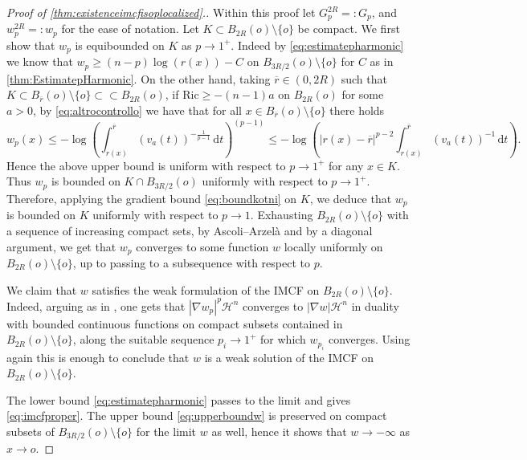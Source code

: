 \documentclass[a4paper,12pt,reqno]{amsart}
\numberwithin{equation}{section}
\theoremstyle{plain}
\theoremstyle{definition}
\theoremstyle{remark}
\newcommand{\abs}[1]{\left\lvert#1\right\rvert}
\newcommand{\vol}{\mathcal{H}^n}
\newcommand{\de}{\ensuremath{\,\mathrm d}} %
\begin{document}
{\begin{proof}[Proof of \cref{thm:existenceimcfisoplocalized}.]
Within this proof let $G_p^{2R} =: G_p$, and $w_p^{2R} =: w_p$ for the ease of notation. Let $K \subset B_{2R}(o) \setminus \{o\}$ be compact. We first show that $w_p$ is equibounded on $K$ as $p \to 1^+$. Indeed by \eqref{eq:estimatepharmonic} we know that $w_p\ge (n-p) \log(r(x)) -C$ on $B_{3R/2}(o)\setminus\{o\}$ for $C$ as in \cref{thm:EstimatepHarmonic}. On the other hand, taking $\overline{r}\in(0,2R)$ such that $K \subset B_{\overline{r}}(o)\setminus\{o\}\subset\subset B_{2R}(o)$, if $\mathrm{Ric} \geq -(n-1)a$ on $B_{2R}(o)$ for some $a >0$, by \eqref{eq:altrocontrollo} we have that for all $x\in B_{\overline{r}}(o)\setminus\{o\}$ there holds
\begin{equation}\label{eq:upperboundw}
w_p(x) \leq - \log\left(\int_{r(x)}^{\overline{r}} (v_a(t))^{-\frac{1}{p-1}} \de t\right)^{(p-1)} \leq - \log\left(\abs{r(x)- \overline{r}}^{p-2} \int_{r(x)}^{\overline{r}} (v_a(t))^{-1}\de t\right).
\end{equation}
Hence the above upper bound is uniform with respect to $p \to 1^+$ for any $x \in K$. Thus $w_p$ is bounded on $K \cap B_{3R/2}(o)$ uniformly with respect to $p\to1^+$. Therefore, applying the gradient bound \eqref{eq:boundkotni} on $K$, we deduce that $w_p$ is bounded on $K$ uniformly with respect to $p\to1$. Exhausting $B_{2R}(o)\setminus\{o\}$ with a sequence of increasing compact sets, by Ascoli--Arzel\`{a} and by a diagonal argument, we get that $w_p$ converges to some function $w$ locally uniformly on $B_{2R}(o)\setminus\{o\}$, up to passing to a subsequence with respect to $p$.

We claim that $w$ satisfies the weak formulation of the IMCF on $B_{2R}(o)\setminus\{o\}$. Indeed, arguing as in \cite[Equation (9)]{MoserIMCF}, one gets that $|\nabla w_p|^p\vol$ converges to $|\nabla w|\vol$ in duality with bounded continuous functions on compact subsets contained in $B_{2R}(o)\setminus \{o\}$, along the suitable sequence $p_i\to 1^+$ for which $w_{p_i}$ converges. Using again \cite[Equation (9)]{MoserIMCF} this is enough to conclude that $w$ is a weak solution of the IMCF on $B_{2R}(o)\setminus\{o\}$. 

The lower bound \eqref{eq:estimatepharmonic} passes to the limit and gives \eqref{eq:imcfproper}. The upper bound \eqref{eq:upperboundw} is preserved on compact subsets of $B_{3R/2}(o) \setminus \{o\}$ for the limit $w$ as well, hence it shows that $w \to -\infty$ as $x  \to o$.


\end{proof}}
\end{document}
